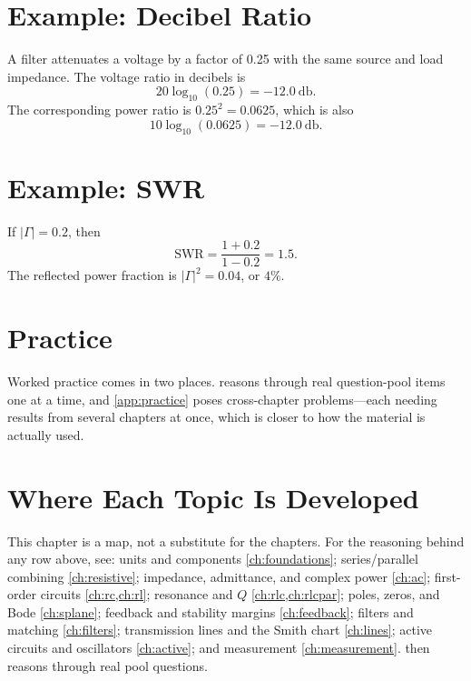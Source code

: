 \section{Example: Decibel Ratio}
A filter attenuates a voltage by a factor of 0.25 with the same source and load
impedance. The voltage ratio in decibels is
\[
20\log_{10}(0.25)= -\SI{12.0}{\decibel}.
\]
The corresponding power ratio is \(0.25^2=0.0625\), which is also
\[
10\log_{10}(0.0625)= -\SI{12.0}{\decibel}.
\]

\section{Example: SWR}
If \(|\Gamma|=0.2\), then
\[
\mathrm{SWR}=\frac{1+0.2}{1-0.2}=1.5.
\]
The reflected power fraction is \(|\Gamma|^2=0.04\), or \(4\%\).

\section{Practice}
Worked practice comes in two places.  reasons through real
question-pool items one at a time, and \cref{app:practice} poses cross-chapter
problems---each needing results from several chapters at once, which is closer to how
the material is actually used.

\section{Where Each Topic Is Developed}
This chapter is a map, not a substitute for the chapters. For the reasoning behind
any row above, see: units and components \cref{ch:foundations}; series/parallel
combining \cref{ch:resistive}; impedance, admittance, and complex power
\cref{ch:ac}; first-order circuits \cref{ch:rc,ch:rl}; resonance and \(Q\)
\cref{ch:rlc,ch:rlcpar}; poles, zeros, and Bode \cref{ch:splane}; feedback and
stability margins \cref{ch:feedback}; filters and matching \cref{ch:filters};
transmission lines and the Smith chart \cref{ch:lines}; active circuits and
oscillators \cref{ch:active}; and measurement \cref{ch:measurement}.
 then reasons through real pool questions.
